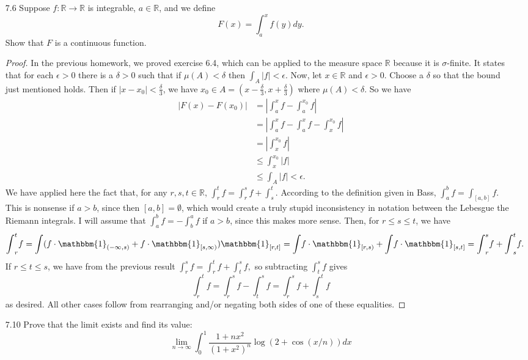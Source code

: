 \documentclass[10pt]{article}
\newcommand{\R}{\mathbb{R}}
\newcommand{\Int}{{\displaystyle \int}}
\begin{document}
\begin{enumerate}
\item[7.6] Suppose $f: \R \rightarrow \R$ is integrable, $a \in \R$, and we define
$$
F(x) = \Int_a^x f(y)dy.
$$
Show that $F$ is a continuous function.

\begin{proof}
In the previous homework, we proved exercise 6.4, which can be applied to the measure space $\R$ because it is $\sigma$-finite.  It states that for each $\epsilon > 0$ there is a $\delta>0$ such that if $\mu(A) < \delta$ then $\Int_A |f| < \epsilon$.  Now, let $x \in \R$ and $\epsilon > 0$.  Choose a $\delta$ so that the bound just mentioned holds.  Then if $|x - x_0| < \frac{\delta}{3}$, we have $x_0 \in A = (x - \frac{\delta}{3}, x + \frac{\delta}{3})$ where $\mu(A) < \delta$.  So we have
\begin{align*}
|F(x) - F(x_0)| &= \left| \Int_a^x f - \Int_a^{x_0} f \right| \\
&= \left| \Int_a^x f - \Int_a^x f - \Int_x^{x_0} f \right| \\
&= \left|\Int_x^{x_0} f \right| \\
& \leq \Int_x^{x_0} |f| \\
& \leq \Int_A |f| < \epsilon.
\end{align*}
We have applied here the fact that, for any $r,s,t \in \R$, $\Int_r^t f = \Int_r^s f + \Int_s^t$.  According to the definition given in Bass, $\Int_a^b f = \Int_{[a,b]} f$.  This is nonsense if $a > b$, since then $[a,b] = \emptyset$, which would create a truly stupid inconsistency in notation between the Lebesgue the Riemann integrals.  I will assume that $\Int_a^b f = -\Int_b^a f$ if $a > b$, since this makes more sense.  Then, for $r \leq s \leq t$, we have
$$
\Int_r^t f = \Int (f \cdot \mathbbm{1}_{(-\infty,s)} + f \cdot \mathbbm{1}_{[s,\infty)})\mathbbm{1}_{[r,t]} = \Int f \cdot \mathbbm{1}_{[r,s)} + \Int f \cdot \mathbbm{1}_{[s,t]} = \Int_r^s f + \Int_s^t f.
$$
If $r \leq t \leq s$, we have from the previous result
$
\Int_r^s f = \Int_r^t f + \Int_t^s f,
$
so subtracting $\Int_t^s f$ gives
$$
\Int_r^t f = \Int_r^s f - \Int_t^s f = \Int_r^s f + \Int_s^t f
$$
as desired.  All other cases follow from rearranging and/or negating both sides of one of these equalities.
\end{proof}

\item[7.10] Prove that the limit exists and find its value:
$$
\lim_{n \rightarrow \infty} \Int_0^1 \frac{1+nx^2}{(1+x^2)^n}\log (2+\cos(x/n))dx
$$


\end{enumerate}
\end{document}
